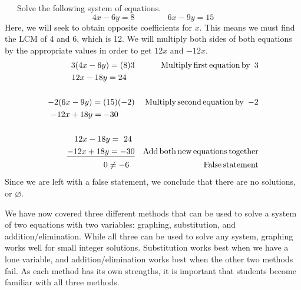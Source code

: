 \begin{example}~~~Solve the following system of equations.
      $$4 x - 6 y = 8\qquad\qquad 6 x - 9 y = 15$$
Here, we will seek to obtain opposite coefficients for $x$.  This means we must find the LCM of 4 and 6, which is 12.  We will multiply both sides of both equations by the appropriate values in order to get $12x$ and $-12x$. 
\begin{eqnarray*}
    3 (4 x - 6 y) = (8) 3 &  & \operatorname{Multiply} \operatorname{first} \operatorname{equation}
    \operatorname{by~} 3\\
    12 x - 18 y = 24~~~ &  & \\
    &  & \\
    - 2 (6 x - 9 y) = (15) (- 2) &  & \operatorname{Multiply} \operatorname{second}
    \operatorname{equation} \operatorname{by~} - 2\\
    - 12 x + 18 y = - 30~~~~~~ &  & \\
    &  & \\
    12 x - 18 y = ~24~ &  &\\
    \underline{- 12 x + 18 y = - 30} &  &  \operatorname{Add} \operatorname{both} \operatorname{new} \operatorname{equations}
    \operatorname{together}\\
    0 \neq - 6~~ &  & \operatorname{False} \operatorname{statement}
  \end{eqnarray*}
Since we are left with a false statement, we conclude that there are no solutions, or $\varnothing$.\pp
\end{example}
  
We have now covered three different methods that can be used to solve a system of
two equations with two variables: graphing, substitution, and addition/elimination. While all three can be used to solve any system, graphing works well for small integer solutions. Substitution works
best when we have a lone variable, and addition/elimination works best when the other
two methods fail. As each method has its own strengths, it is important that students become familiar with all three methods.

%
